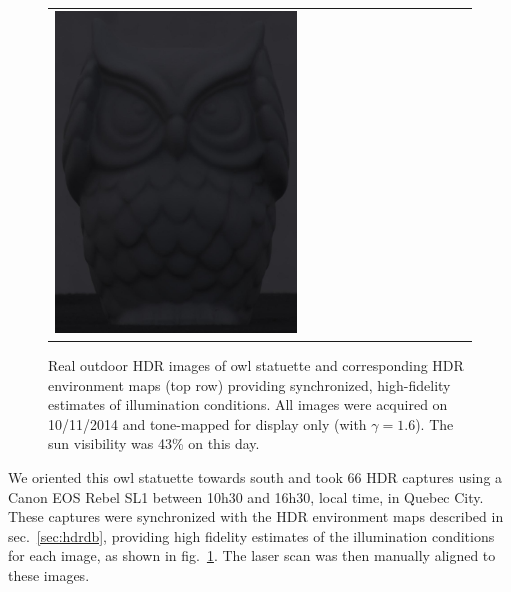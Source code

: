 \begin{figure}[!ht]
\begin{tabular}{@{}rcccccccccccc@{}}
    \includegraphics[width=\customwidth]{./figures/reconstruction/object/160215.jpg}

    \end{tabular}
    \caption[Real data]{Real outdoor HDR images of owl statuette and corresponding HDR environment maps (top row) providing synchronized, high-fidelity estimates of illumination conditions. All images were acquired on 10/11/2014 and tone-mapped for display only (with $\gamma = 1.6$). The sun visibility was 43\% on this day. }
    \label{fig:reconstruction:example_envmaps}
    \vspace{-1em}
\end{figure}

We oriented this owl statuette towards south and took 66 HDR captures using a Canon EOS Rebel SL1 between 10h30 and 16h30, local time, in Quebec City. These captures were synchronized with the HDR environment maps described in sec.~\ref{sec:hdrdb}, providing high fidelity estimates of the illumination conditions for each image, as shown in fig.~\ref{fig:reconstruction:example_envmaps}. The laser scan was then manually aligned to these images.

